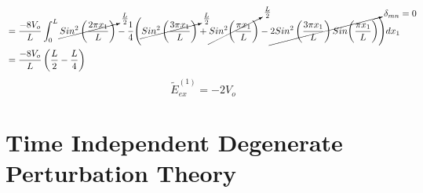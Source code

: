 \documentclass[12pt,fancychapters]{report}
\numberwithin{equation}{section}
\begin{document}
\begin{align*}
	& = \frac{-8V_o}{L}\int_{0}^{L}\cancelto{\frac{L}{2}}{Sin^2\left(\frac{2\pi x_1}{L}\right)}-
	\frac{1}{4}\Bigg(\cancelto{\frac{L}{2}}{Sin^2\left(\frac{3\pi x_1}{L}\right)}
	+\cancelto{\frac{L}{2}}{Sin^2\bigg(\frac{\pi x_1}{L}\bigg)}
	-\cancelto{\mathlarger{\delta_{mn}=0}}{2 Sin^2\left(\frac{3\pi x_1}{L}\right)
Sin\bigg(\frac{\pi x_1}{L}\bigg)}\Bigg)dx_1\\
	&= \frac{-8V_o}{L}\left(\frac{L}{2}-\frac{L}{4}\right)
\end{align*}
\begin{equation*}
	\boxed{\tilde{E}^{(1)}_{ex}= -2V_o}
\end{equation*}
\newpage
\chapter{Time Independent Degenerate Perturbation Theory}
\end{document}
